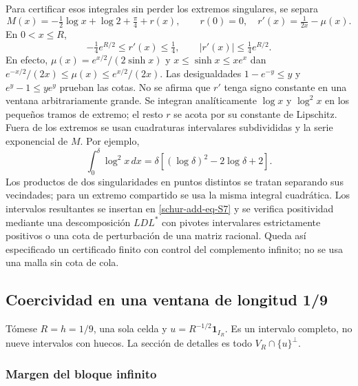 Para certificar esos integrales sin perder los extremos singulares,
se separa
\begin{equation}
M(x)=-\tfrac12\log x+\log2+\tfrac\pi4+r(x),
\qquad r(0)=0,\quad r'(x)=\tfrac1{2x}-\mu(x).
\label{schur-add-eq-S8}
\end{equation}
En \(0<x\leq R\),
\begin{equation}
-\tfrac14 e^{R/2}\leq r'(x)\leq\tfrac14,
\qquad |r'(x)|\leq\tfrac14e^{R/2}.
\label{schur-add-display-19}
\end{equation}
En efecto, \(\mu(x)=e^{x/2}/(2\sinh x)\) y
\(x\leq\sinh x\leq xe^x\) dan
\(e^{-x/2}/(2x)\leq\mu(x)\leq e^{x/2}/(2x)\).
Las desigualdades \(1-e^{-y}\leq y\) y \(e^y-1\leq ye^y\)
prueban las cotas. No se afirma que \(r'\) tenga signo constante
en una ventana arbitrariamente grande.
Se integran analíticamente \(\log x\) y \(\log^2x\) en los pequeños
tramos de extremo; el resto \(r\) se acota por su constante de Lipschitz.
Fuera de los extremos se usan cuadraturas intervalares subdivididas y
la serie exponencial de \(M\). Por ejemplo,
\begin{equation}
\int_0^\delta\log^2x\,dx
=\delta[(\log\delta)^2-2\log\delta+2].
\label{schur-add-display-20}
\end{equation}
Los productos de dos singularidades en puntos distintos se tratan
separando sus vecindades; para un extremo compartido se usa la misma
integral cuadrática. Los intervalos resultantes se insertan en \eqref{schur-add-eq-S7} y
se verifica positividad mediante una descomposición \(LDL^*\) con
pivotes intervalares estrictamente positivos o una cota de perturbación
de una matriz racional. Queda así especificado un certificado finito
con control del complemento infinito; no se usa una malla sin cota de cola.

\subsection{Coercividad en una ventana de longitud 1/9}
\label{schur-add-sub-248}

Tómese \(R=h=1/9\), una sola celda y \(u=R^{-1/2}\mathbf1_{I_R}\).
Es un intervalo completo, no nueve intervalos con huecos. La sección
de detalles es todo \(V_R\cap\{u\}^{\perp}\).

\subsubsection{Margen del bloque infinito}
\label{schur-add-sub-254}

